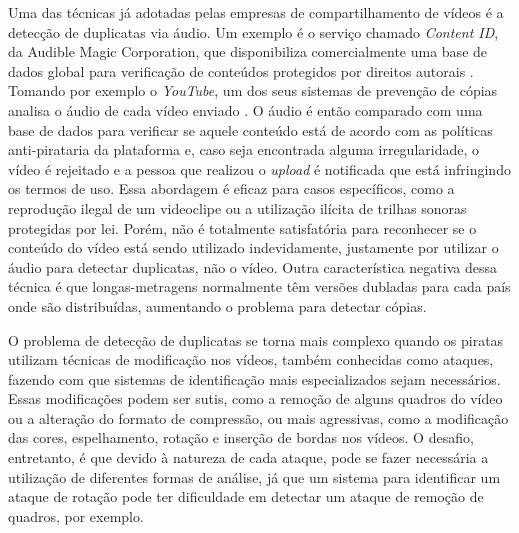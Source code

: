 Uma das técnicas já adotadas pelas empresas de compartilhamento de vídeos é a detecção de duplicatas via áudio. Um exemplo é o serviço chamado \textit{Content ID}, da Audible Magic Corporation, que disponibiliza comercialmente uma base de dados global para verificação de conteúdos protegidos por direitos autorais \cite{audiblemagic}. Tomando por exemplo o \textit{YouTube}, um dos seus sistemas de prevenção de cópias analisa o áudio de cada vídeo enviado \cite{youtubeblog}. O áudio é então comparado com uma base de dados para verificar se aquele conteúdo está de acordo com as políticas anti-pirataria da plataforma e, caso seja encontrada alguma irregularidade, o vídeo é rejeitado e a pessoa que realizou o \textit{upload} é notificada que está infringindo os termos de uso. Essa abordagem é eficaz para casos específicos, como a reprodução ilegal de um videoclipe ou a utilização ilícita de trilhas sonoras protegidas por lei. Porém, não é totalmente satisfatória para reconhecer se o conteúdo do vídeo está sendo utilizado indevidamente, justamente por utilizar o áudio para detectar duplicatas, não o vídeo. Outra característica negativa dessa técnica é que longas-metragens normalmente têm versões dubladas para cada país onde são distribuídas, aumentando o problema para detectar cópias.


O problema de detecção de duplicatas se torna mais complexo quando os piratas utilizam técnicas de modificação nos vídeos, também conhecidas como ataques, fazendo com que sistemas de identificação mais especializados sejam necessários. Essas modificações podem ser sutis, como a remoção de alguns quadros do vídeo ou a alteração do formato de compressão, ou mais agressivas, como a modificação das cores, espelhamento, rotação e inserção de bordas nos vídeos. O desafio, entretanto, é que devido à natureza de cada ataque, pode se fazer necessária a utilização de diferentes formas de análise, já que um sistema para identificar um ataque de rotação pode ter dificuldade em detectar um ataque de remoção de quadros, por exemplo. 

